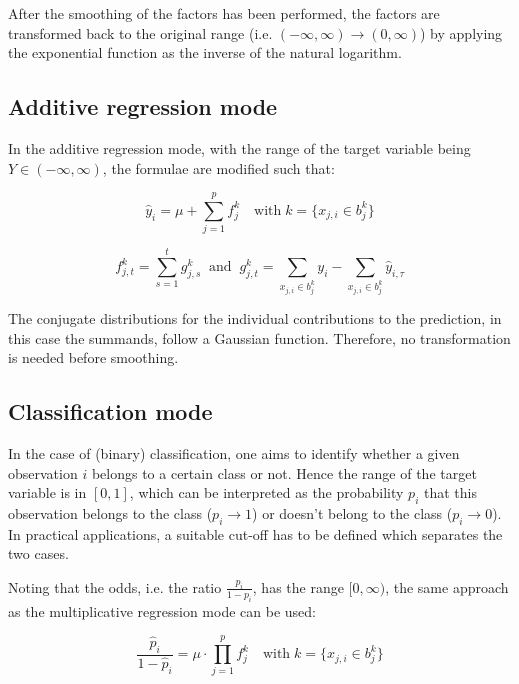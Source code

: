 \documentclass[BCOR=1mm, DIV=calc,10pt,
twoside=true,
twocolumn,
headings=normal]{scrartcl}
\begin{document}
After the smoothing of the factors has been performed, the factors are transformed back to
the original range (i.e. $(-\infty, \infty) \to (0, \infty)$) by applying the exponential
function as the inverse of the natural logarithm.


\subsection{Additive regression mode}

In the additive regression mode, with the range of the target variable being
$Y \in (-\infty, \infty)$, the formulae are modified such that:

\begin{equation} \label{summands}
\hat{y}_i = \mu + \sum \limits_{j=1}^p f^k_j  \quad \text{with}\; k=\{ x_{j,i} \in b^k_j\}
\end{equation}

\begin{equation}
f^k_{j,t} = \sum \limits_{s=1}^t g^k_{j,s} \;\; \mathrm{and} \;\; g^k_{j,t} = \sum \limits_{x_{j,i} \in b^k_j} y_i - \sum \limits_{x_{j,i} \in b^k_j} \hat{y}_{i,\tau}
\end{equation}

The conjugate distributions for the individual contributions to the prediction, in this
case the summands, follow a Gaussian function. Therefore, no transformation is needed
before smoothing.


\subsection{Classification mode}

In the case of (binary) classification, one aims to identify whether a given observation
$i$ belongs to a certain class or not. Hence the range of the target variable is in
$[0,1]$, which can be interpreted as the probability $p_i$ that this observation belongs
to the class ($p_i \to 1$) or doesn't belong to the class ($p_i \to 0$). In practical
applications, a suitable cut-off has to be defined which separates the two cases.

Noting that the odds, i.e. the ratio $\frac {p_i}{1-p_i}$, has the range $[0, \infty)$,
the same approach as the multiplicative regression mode can be used:

\begin{equation} \label{odds}
\frac{\hat{p}_i}{1 - \hat{p}_i} = \mu \cdot \prod \limits_{j=1}^p f^k_j  \quad \text{with}\; k=\{ x_{j,i} \in b^k_j\}
\end{equation}
\end{document}
